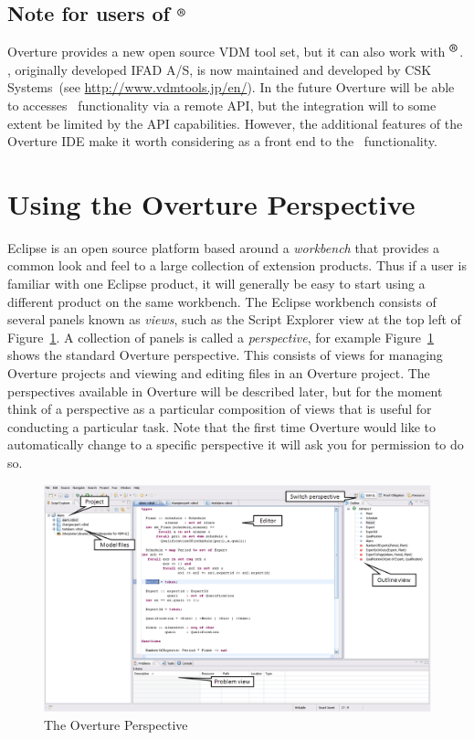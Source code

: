 {\subsection*{Note for users of \vdmtools$^{\mbox{\small\textbf{{\textregistered}}}}$}
Overture provides a new open source VDM tool set, but it can
also work with
\vdmtools$^{\mbox{\small\textbf{{\textregistered}}}}$. \vdmtools, originally developed IFAD A/S, is now
maintained and developed by CSK Systems~(see
\url{http://www.vdmtools.jp/en/}). In the future Overture will be able
to accesses
\vdmtools\ functionality via a remote API, but the integration will to
some extent be limited by the API capabilities. However, the additional
features of the Overture IDE make it worth considering as a front end
to the \vdmtools\ functionality.

\section{Using the Overture Perspective}\label{sec:vdmsupport}

Eclipse is an open source platform based around a \emph{workbench}
that provides a common look and feel to a large collection of
extension products. Thus if a user is familiar with one Eclipse
product, it will generally be easy to start using a different product
on the same workbench. The Eclipse workbench consists of several
panels known as \emph{views}, such as the Script Explorer view at the
top left of Figure~\ref{fig:OverturePerspective}. A
collection of panels is called a \emph{perspective}, for example
Figure~\ref{fig:OverturePerspective} shows the standard
Overture perspective. This consists of views for managing Overture
projects and viewing and editing files in an Overture project. The perspectives
available in Overture will be described later, but for the moment
think of a perspective as a particular composition of views that is
useful for conducting a particular task. Note that the first time
Overture would like to automatically change to a specific perspective
it will ask you for permission to do so.

\begin{figure}[tbh]
\begin{center}
  \includegraphics[width=4.5in]{figures/OverturePerspective}
  \caption[labelInTOC]{The Overture Perspective}
  \label{fig:OverturePerspective}
\end{center}
\end{figure}

}
